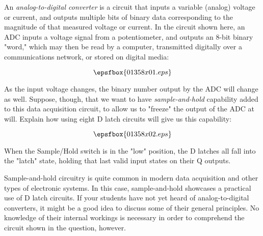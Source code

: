 

An {\it analog-to-digital converter} is a circuit that inputs a variable (analog) voltage or current, and outputs multiple bits of binary data corresponding to the magnitude of that measured voltage or current.  In the circuit shown here, an ADC inputs a voltage signal from a potentiometer, and outputs an 8-bit binary "word," which may then be read by a computer, transmitted digitally over a communications network, or stored on digital media:

$$\epsfbox{01358x01.eps}$$

As the input voltage changes, the binary number output by the ADC will change as well.  Suppose, though, that we want to have {\it sample-and-hold} capability added to this data acquisition circuit, to allow us to "freeze" the output of the ADC at will.  Explain how using eight D latch circuits will give us this capability:

$$\epsfbox{01358x02.eps}$$







When the Sample/Hold switch is in the "low" position, the D latches all fall into the "latch" state, holding that last valid input states on their Q outputs.







Sample-and-hold circuitry is quite common in modern data acquisition and other types of electronic systems.  In this case, sample-and-hold showcases a practical use of D latch circuits.  If your students have not yet heard of analog-to-digital converters, it might be a good idea to discuss some of their general principles.  No knowledge of their internal workings is necessary in order to comprehend the circuit shown in the question, however.




